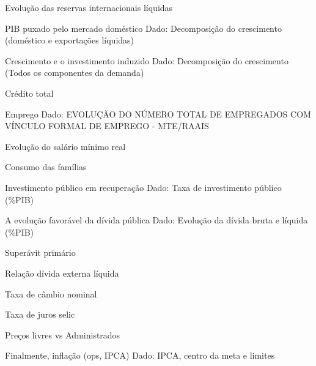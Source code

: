 \documentclass[presentation]{beamer}
\begin{document}
\begin{frame}[label={sec:org5f2c293}]{Evolução das reservas internacionais líquidas}
\end{frame}

\begin{frame}[label={sec:org163e8a5}]{PIB puxado pelo mercado doméstico}
\alert{Dado:} Decomposição do crescimento (doméstico e exportações líquidas)
\end{frame}

\begin{frame}[label={sec:orgf92839b}]{Crescimento e o investimento induzido}
\alert{Dado:} Decomposição do crescimento (Todos os componentes da demanda)
\end{frame}


\begin{frame}[label={sec:org43c3a62}]{Crédito total}
\end{frame}

\begin{frame}[label={sec:org48eb068}]{Emprego}
\alert{Dado:} EVOLUÇÃO DO NÚMERO TOTAL DE EMPREGADOS COM VÍNCULO FORMAL  DE EMPREGO - MTE/RAAIS
\end{frame}


\begin{frame}[label={sec:org3b3d345}]{Evolução do salário mínimo real}
\end{frame}

\begin{frame}[label={sec:org77de168}]{Consumo das famílias}
\end{frame}

\begin{frame}[label={sec:orgd1e9208}]{Investimento público em recuperação}
\alert{Dado:} Taxa de investimento público (\%PIB)
\end{frame}

\begin{frame}[label={sec:orgbae9273}]{A evolução favorável da dívida pública}
\alert{Dado:} Evolução da dívida bruta e líquida (\%PIB)
\end{frame}

\begin{frame}[label={sec:org1724963}]{Superávit primário}
\end{frame}

\begin{frame}[label={sec:org9dcc1d6}]{Relação dívida externa líquida}
\end{frame}


\begin{frame}[label={sec:org1d5647c}]{Taxa de câmbio nominal}
\end{frame}

\begin{frame}[label={sec:org65502a9}]{Taxa de juros selic}
\end{frame}

\begin{frame}[label={sec:org52259c3}]{Preços livres vs Administrados}
\end{frame}

\begin{frame}[label={sec:orgc676766}]{Finalmente, inflação (ops, IPCA)}
\alert{Dado:} IPCA, centro da meta e limites
\end{frame}
\end{document}
